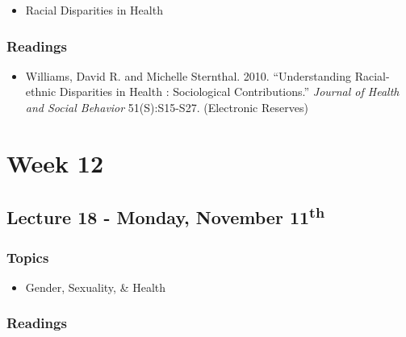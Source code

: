 \documentclass[]{book}
\providecommand{\tightlist}{%
  \setlength{\itemsep}{0pt}\setlength{\parskip}{0pt}}
\begin{document}
\begin{itemize}
\tightlist
\item
  Racial Disparities in Health
\end{itemize}

\hypertarget{readings-19}{%
\subsubsection*{Readings}\label{readings-19}}

\begin{itemize}
\tightlist
\item
  Williams, David R. and Michelle Sternthal. 2010. ``Understanding Racial-ethnic Disparities in Health : Sociological Contributions.'' \emph{Journal of Health and Social Behavior} 51(S):S15-S27. (Electronic Reserves)
\end{itemize}

\newpage

\hypertarget{week-12}{%
\section*{Week 12}\label{week-12}}

\hypertarget{lecture-18---monday-november-11th}{%
\subsection*{\texorpdfstring{Lecture 18 - Monday, November 11\textsuperscript{th}}{Lecture 18 - Monday, November 11th}}\label{lecture-18---monday-november-11th}}

\hypertarget{topics-22}{%
\subsubsection*{Topics}\label{topics-22}}

\begin{itemize}
\tightlist
\item
  Gender, Sexuality, \& Health
\end{itemize}

\hypertarget{readings-20}{%
\subsubsection*{Readings}\label{readings-20}}
\end{document}
